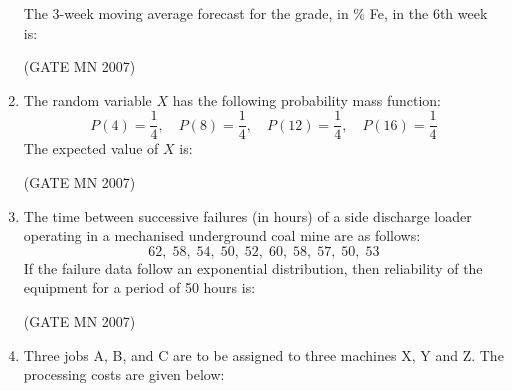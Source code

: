 \documentclass[journal]{IEEEtran}
\begin{document}
\begin{enumerate}
The 3-week moving average forecast for the grade, in \% Fe, in the 6th week is:


\hfill (GATE MN 2007)
\begin{enumerate}
\end{enumerate}


\item The random variable $X$ has the following probability mass function:  
\[
P(4) = \frac14, \quad P(8) = \frac14, \quad P(12) = \frac14, \quad P(16) = \frac14
\]
The expected value of $X$ is:  



\hfill (GATE MN 2007)
\begin{enumerate}
\end{enumerate}


\item The time between successive failures (in hours) of a side discharge loader operating in a mechanised underground coal mine are as follows:  
\[
62, \; 58, \; 54, \; 50, \; 52, \; 60, \; 58, \; 57, \; 50, \; 53
\]
If the failure data follow an exponential distribution, then reliability of the equipment for a period of 50 hours is: 


\hfill (GATE MN 2007)
\begin{enumerate}
\end{enumerate}


\item Three jobs A, B, and C are to be assigned to three machines X, Y and Z. The processing costs are given below:


\end{enumerate}
\end{document}
